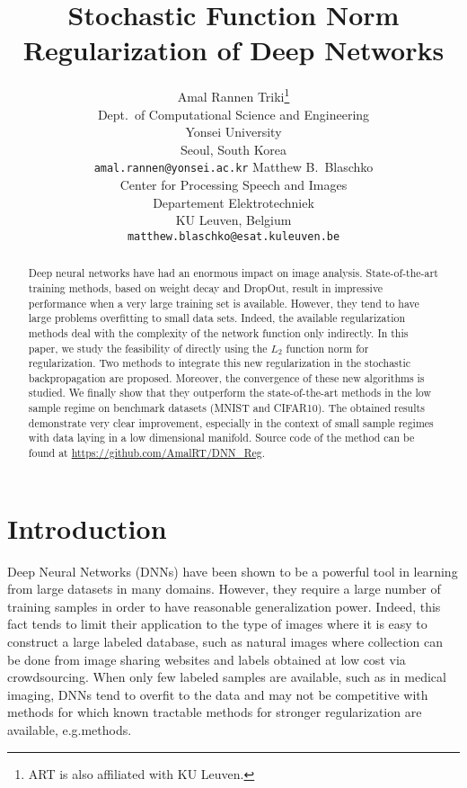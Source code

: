 \documentclass{article}
\begin{document}
\title{Stochastic Function Norm Regularization of Deep Networks}
\author{
  Amal Rannen Triki\thanks{ART is also affiliated with KU Leuven.}\\
  Dept.\ of Computational Science and Engineering\\
  Yonsei University\\
  Seoul, South Korea\\
  \texttt{amal.rannen@yonsei.ac.kr} 
  \And
  Matthew B.\ Blaschko\\
  Center for Processing Speech and Images\\
  Departement Elektrotechniek\\
  KU Leuven, Belgium\\   \texttt{matthew.blaschko@esat.kuleuven.be} \\
}
\maketitle              %

\begin{abstract}
Deep neural networks have had an enormous impact on image analysis. State-of-the-art training methods, based on weight decay and DropOut, result in impressive performance when a very large training set is available. However, they tend to have large problems overfitting to small data sets. Indeed, the available regularization methods deal with the complexity of the network function only indirectly. In this paper, we study the feasibility of directly using the $L_2$ function norm for regularization. Two methods to integrate this new regularization in the stochastic backpropagation are proposed. Moreover, the convergence of these new algorithms is studied. We finally show that they outperform the state-of-the-art methods in the low sample regime on benchmark datasets (MNIST and CIFAR10). The obtained results demonstrate very clear improvement, especially in the context of small sample regimes with data laying in a low dimensional manifold.  Source code of the method can be found at \url{https://github.com/AmalRT/DNN_Reg}.
\end{abstract}

\section{Introduction}

Deep Neural Networks (DNNs) have been shown to be a powerful tool in learning from large datasets in many domains. However, they require a large number of training samples in order to have reasonable generalization power. Indeed, this fact tends to limit their application to the type of images where it is easy to construct a large labeled database, such as natural images where collection can be done from image sharing websites and labels obtained at low cost via crowdsourcing. When only few labeled samples are available, such as in medical imaging, DNNs tend to overfit to the data and may not be competitive with methods for which known tractable methods for stronger regularization are available, e.g. methods.
\end{document}
